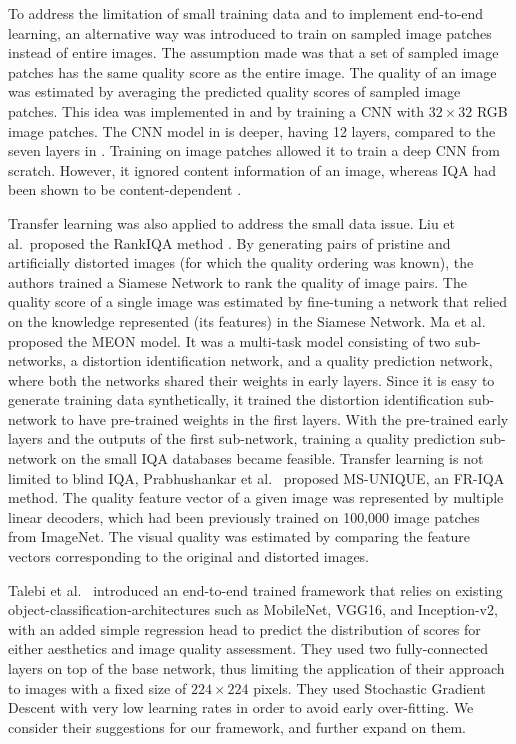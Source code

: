 \documentclass[10pt,journal,compsoc]{IEEEtran}
\begin{document}
To address the limitation of small training data and to implement end-to-end learning, an alternative way was introduced to train on sampled image patches instead of entire images. The assumption made was that a set of sampled image patches has the same quality score as the entire image. The quality of an image was estimated by averaging the predicted quality scores of sampled image patches. This idea was implemented in \cite{conv1} and \cite{boss} by training a CNN with $32 \times 32$ RGB image patches. The CNN model in \cite{boss} is deeper, having 12 layers, compared to the seven layers in \cite{conv1}. Training on image patches allowed it to train a deep CNN from scratch. However, it ignored content information of an image, whereas IQA had been shown to be content-dependent \cite{siahaan2016does}.


Transfer learning was also applied to address the small data issue. 
Liu et al.\ proposed the RankIQA method \cite{Liu_2017_ICCV}. By generating pairs of pristine and artificially distorted images (for which the quality ordering was known), the authors trained a Siamese Network to rank the quality of image pairs. The quality score of a single image was estimated by fine-tuning a network that relied on the knowledge represented (its features) in the Siamese Network. Ma et al.\ \cite{ma2018end} proposed the MEON model. It was a multi-task model consisting of two sub-networks, a distortion identification network, and a quality prediction network, where both the networks shared their weights in early layers. Since it is easy to generate training data synthetically, it trained the distortion identification sub-network to have pre-trained weights in the first layers. With the pre-trained early layers and the outputs of the first sub-network, training a quality prediction sub-network on the small IQA databases became feasible.
Transfer learning is not limited to blind IQA, Prabhushankar et al.~\cite{prabhushankar2017ms} proposed MS-UNIQUE, an FR-IQA method. The quality feature vector of a given image was represented by multiple linear decoders, which had been previously trained on 100,000 image patches from ImageNet. The visual quality was estimated by comparing the feature vectors corresponding to the original and distorted images.

Talebi et al.\ \cite{talebi_nima_2017} introduced an end-to-end trained framework that relies on existing object-classification-architectures such as MobileNet, VGG16, and Inception-v2, with an added simple regression head to predict the distribution of scores for either aesthetics and image quality assessment. They used two fully-connected layers on top of the base network, thus limiting the application of their approach to images with a fixed size of $224\times224$ pixels. They used Stochastic Gradient Descent with very low learning rates in order to avoid early over-fitting. We consider their suggestions for our framework, and further expand on them.
\end{document}
